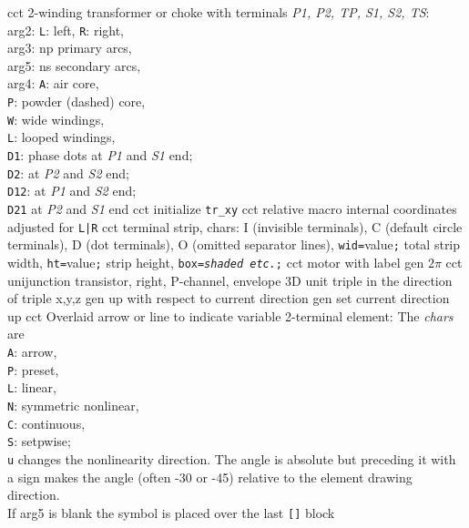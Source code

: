 %
  {cct}%
  {2-winding transformer or choke with terminals {\sl P1, P2, TP, S1, S2, TS}:\\
    arg2: {\tt L}: left, {\tt R}: right,\\
    arg3: np primary arcs,\\
    arg5: ns secondary arcs,\\
    arg4:
    {\tt A}: air core,\\
    {\tt P}: powder (dashed) core,\\
    {\tt W}: wide windings,\\
    {\tt L}: looped windings,\\
    {\tt D1}: phase dots at {\sl P1} and {\sl S1} end;\\
    {\tt D2}: at {\sl P2} and {\sl S2} end;\\
    {\tt D12}: at {\sl P1} and {\sl S2} end;\\
    {\tt D21} at {\sl P2} and {\sl S1} end
   }%
%
  {cct}%
  {initialize {\tt tr\_xy}}%
%
  {cct}%
  {relative macro internal coordinates adjusted for {\tt L|R}}%
%
  {cct}%
  {terminal strip, chars:
   I (invisible terminals), C (default circle terminals), D (dot terminals),
   O (omitted separator lines), {\tt wid=}value{\tt ;} total strip width,
   {\tt ht=}value{\tt ;} strip height, {\tt box={\sl shaded etc.};}%
    }%
%
  {cct}%
  {motor with label}%
%
  {gen}%
  {$2\pi$}%
%
%
%
  {cct}%
  {unijunction transistor, right, P-channel, envelope
    }%
%
  {3D} {unit triple in the direction of triple x,y,z}%
%
  {gen}%
  {up with respect to current direction}%
%
  {gen}%
  {set current direction up }%
%
%
%
  {cct}%
  {Overlaid arrow or line to indicate variable 2-terminal element:
    The {\sl chars} are\\
    {\tt A}: arrow,\\
    {\tt P}: preset,\\
    {\tt L}: linear,\\
    {\tt N}:  symmetric nonlinear,\\
    {\tt C}: continuous,\\
    {\tt S}: setpwise;\\
    {\tt u} changes the nonlinearity direction.  The angle is absolute
    but preceding it with a sign makes the angle (often -30 or -45)
    relative to the element drawing direction.\\
    If arg5 is blank the symbol is placed over the last {\tt []} block
   }%
